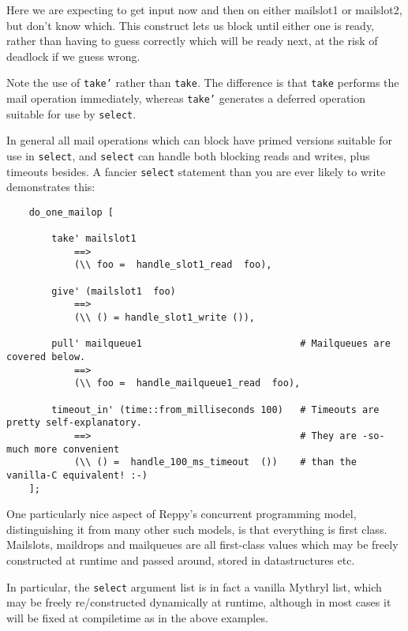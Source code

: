 \begin{itemize}
\begin{itemize}
Here we are expecting to get input now and 
then on either mailslot1 or mailslot2, but 
don't know which.  This construct lets us 
block until either one is ready, rather than 
having to guess correctly which will be ready 
next, at the risk of deadlock if we guess wrong. 

Note the use of {\tt take'} rather than {\tt take}. 
The difference is that {\tt take} performs the 
mail operation immediately, whereas {\tt take'} 
generates a deferred operation suitable for 
use by {\tt select}.

In general all mail operations which can 
block have primed versions suitable for 
use in {\tt select}, and {\tt select} can handle 
both blocking reads and writes, plus timeouts 
besides.  A fancier {\tt select} statement than 
you are ever likely to write demonstrates this: 

\begin{verbatim}
    do_one_mailop [

        take' mailslot1
            ==>
            (\\ foo =  handle_slot1_read  foo),

        give' (mailslot1  foo)
            ==>
            (\\ () = handle_slot1_write ()),

        pull' mailqueue1                            # Mailqueues are covered below.
            ==>
            (\\ foo =  handle_mailqueue1_read  foo),

        timeout_in' (time::from_milliseconds 100)   # Timeouts are pretty self-explanatory.
            ==>                                     # They are -so- much more convenient
            (\\ () =  handle_100_ms_timeout  ())    # than the vanilla-C equivalent! :-)
    ];
\end{verbatim}


One particularly nice aspect of Reppy's concurrent 
programming model, distinguishing it from many other 
such models, is that everything is first class. 
Mailslots, maildrops and mailqueues are all first-class 
values which may be freely constructed at runtime and 
passed around, stored in datastructures etc. 

In particular, the {\tt select} argument list is in fact 
a vanilla Mythryl list, which may be freely re/constructed 
dynamically at runtime, although in most cases it will 
be fixed at compiletime as in the above examples. 


\end{itemize}
\end{itemize}
